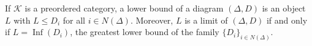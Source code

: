 If $\mathcal{K}$ is a preordered category, a lower bound of a diagram $(\Delta, D)$ is an object $L$ with $L \leqslant D_i$ for all $i \in N(\Delta)$. Moreover, $L$ is a limit of $(\Delta, D)$ if and only if $L = \operatorname{Inf}(D_i)$, the greatest lower bound of the family $\{D_i\}_{i \in N(\Delta)}$.
